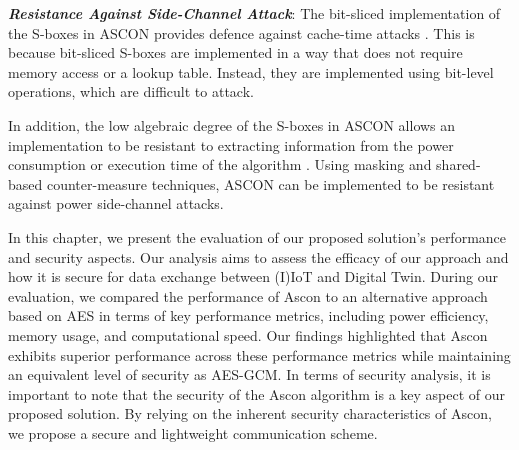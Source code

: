 \textbf{\textit{Resistance Against Side-Channel Attack}}: The bit-sliced implementation of the S-boxes in ASCON provides defence against cache-time attacks \cite{dobraunig_ascon_nodate}. This is because bit-sliced S-boxes are implemented in a way that does not require memory access or a lookup table. Instead, they are implemented using bit-level operations, which are difficult to attack.

In addition, the low algebraic degree of the S-boxes in ASCON allows an implementation to be resistant to extracting information from the power consumption or execution time of the algorithm \cite{dobraunig_ascon_nodate}. Using masking \cite{gross_reconciling_2017} and shared-based \cite{gologlu_division_2016} counter-measure techniques, ASCON can be implemented to be resistant against power side-channel attacks. 


In this chapter, we present the evaluation of our proposed solution's performance and security aspects. Our analysis aims to assess the efficacy of our approach and how it is secure for data exchange between (I)IoT and Digital Twin.
During our evaluation, we compared the performance of Ascon to an alternative approach based on AES in terms of key performance metrics, including power efficiency, memory usage, and computational speed. Our findings highlighted that Ascon exhibits superior performance across these performance metrics while maintaining an equivalent level of security as AES-GCM.
In terms of security analysis, it is important to note that the security of the Ascon algorithm is a key aspect of our proposed solution. By relying on the inherent security characteristics of Ascon, we propose a secure and lightweight communication scheme. 
